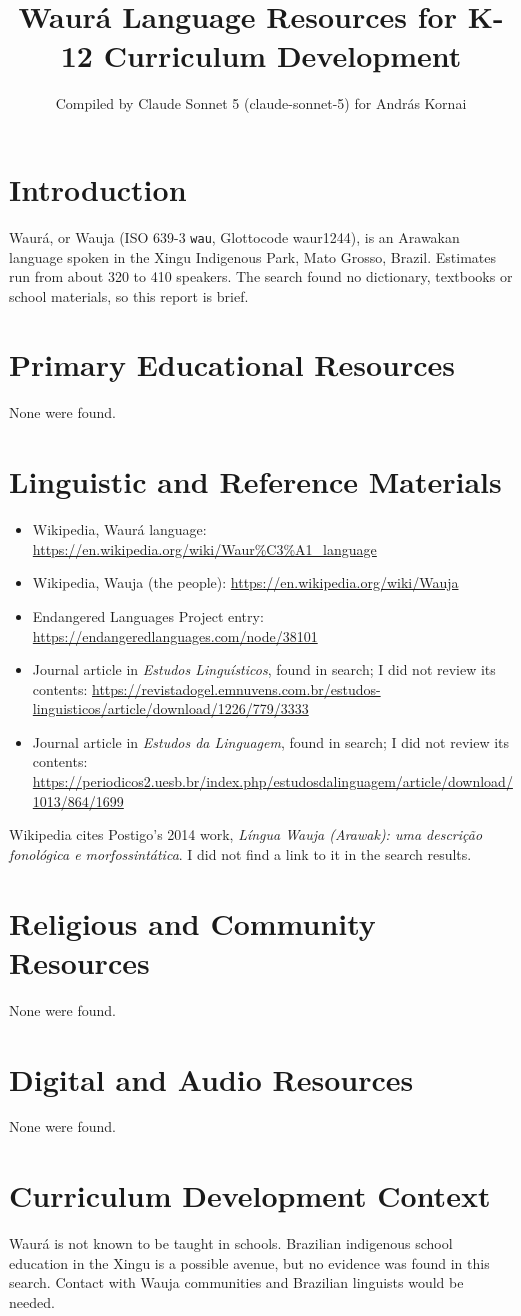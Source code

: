 \documentclass[12pt]{article}
\title{Waur\'a Language Resources for K-12 Curriculum Development}
\author{Compiled by Claude Sonnet 5 (claude-sonnet-5) for Andr\'as Kornai}
\date{}
\begin{document}
\maketitle

\section{Introduction}
Waur\'a, or Wauja (ISO 639-3 \texttt{wau}, Glottocode waur1244), is an Arawakan language spoken in the Xingu Indigenous Park, Mato Grosso, Brazil. Estimates run from about 320 to 410 speakers. The search found no dictionary, textbooks or school materials, so this report is brief.

\section{Primary Educational Resources}
None were found.

\section{Linguistic and Reference Materials}
\begin{itemize}
\item Wikipedia, Waur\'a language: \url{https://en.wikipedia.org/wiki/Waur%C3%A1_language}
\item Wikipedia, Wauja (the people): \url{https://en.wikipedia.org/wiki/Wauja}
\item Endangered Languages Project entry: \url{https://endangeredlanguages.com/node/38101}
\item Journal article in \emph{Estudos Lingu\'isticos}, found in search; I did not review its contents: \url{https://revistadogel.emnuvens.com.br/estudos-linguisticos/article/download/1226/779/3333}
\item Journal article in \emph{Estudos da Linguagem}, found in search; I did not review its contents: \url{https://periodicos2.uesb.br/index.php/estudosdalinguagem/article/download/1013/864/1699}
\end{itemize}
Wikipedia cites Postigo's 2014 work, \emph{L\'ingua Wauja (Arawak): uma descri\c{c}\~ao fonol\'ogica e morfossint\'atica}. I did not find a link to it in the search results.

\section{Religious and Community Resources}
None were found.

\section{Digital and Audio Resources}
None were found.

\section{Curriculum Development Context}
Waur\'a is not known to be taught in schools. Brazilian indigenous school education in the Xingu is a possible avenue, but no evidence was found in this search. Contact with Wauja communities and Brazilian linguists would be needed.
\end{document}
